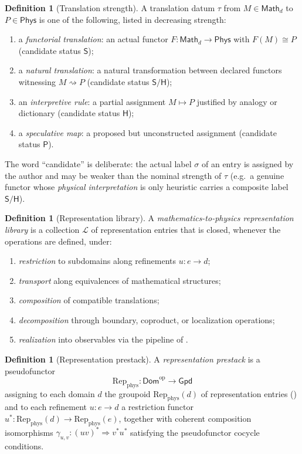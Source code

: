 \documentclass[12pt]{article}
\theoremstyle{definition}
\newtheorem{definition}[theorem]{Definition}
\theoremstyle{remark}
\newcommand{\Dom}{\mathsf{Dom}}
\newcommand{\Math}{\mathsf{Math}}
\newcommand{\Phys}{\mathsf{Phys}}
\newcommand{\Gpd}{\mathsf{Gpd}}
\newcommand{\Repphys}{\mathrm{Rep}_{\mathrm{phys}}}
\newcommand{\op}{\mathrm{op}}
\newcommand{\Sstat}{\mathsf{S}}
\newcommand{\Hstat}{\mathsf{H}}
\newcommand{\Pstat}{\mathsf{P}}
\begin{document}
\begin{definition}[Translation strength]
\label{def:transl}
A translation datum $\tau$ from $M \in \Math_d$ to $P \in \Phys$ is one of the
following, listed in decreasing strength:
\begin{enumerate}[leftmargin=2.4em]
\item a \emph{functorial translation}: an actual functor $F : \Math_d \to \Phys$
  with $F(M) \cong P$ (candidate status $\Sstat$);
\item a \emph{natural translation}: a natural transformation between declared
  functors witnessing $M \rightsquigarrow P$ (candidate status $\Sstat/\Hstat$);
\item an \emph{interpretive rule}: a partial assignment $M \mapsto P$ justified
  by analogy or dictionary (candidate status $\Hstat$);
\item a \emph{speculative map}: a proposed but unconstructed assignment
  (candidate status $\Pstat$).
\end{enumerate}
The word ``candidate'' is deliberate: the actual label $\sigma$ of an entry is
assigned by the author and may be weaker than the nominal strength of $\tau$
(e.g.\ a genuine functor whose \emph{physical interpretation} is only heuristic
carries a composite label $\Sstat/\Hstat$).
\end{definition}

\begin{definition}[Representation library]
\label{def:library}
A \emph{mathematics-to-physics representation library} is a collection
$\mathcal{L}$ of representation entries that is closed, whenever the operations
are defined, under:
\begin{enumerate}[leftmargin=2.4em]
\item \emph{restriction} to subdomains along refinements $u : e \to d$;
\item \emph{transport} along equivalences of mathematical structures;
\item \emph{composition} of compatible translations;
\item \emph{decomposition} through boundary, coproduct, or localization
  operations;
\item \emph{realization} into observables via the pipeline of
  .
\end{enumerate}
\end{definition}

\begin{definition}[Representation prestack]
\label{def:prestack}
A \emph{representation prestack} is a pseudofunctor
\[
  \Repphys : \Dom^{\op} \longrightarrow \Gpd
\]
assigning to each domain $d$ the groupoid $\Repphys(d)$ of representation entries
() and to each refinement $u : e \to d$ a restriction
functor $u^\ast : \Repphys(d) \to \Repphys(e)$, together with coherent
composition isomorphisms $\gamma_{u,v} : (u v)^\ast \Rightarrow v^\ast u^\ast$
satisfying the pseudofunctor cocycle conditions.
\end{definition}
\end{document}
